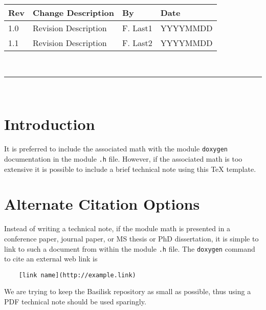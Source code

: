 \documentclass[]{BasiliskReportMemo}
\begin{document}
\makeCover

%
%
\pagestyle{empty}
{\renewcommand{\arraystretch}{2}
\noindent
\begin{longtable}{|p{0.5in}|p{3.5in}|p{1.07in}|p{0.9in}|}
\hline
{\bfseries Rev} & {\bfseries Change Description} & {\bfseries By}& {\bfseries Date} \\
\hline
1.0 & Revision Description & F. Last1 & YYYYMMDD\\
\hline
1.1 & Revision Description& F. Last2 & YYYYMMDD\\
\hline

\end{longtable}
}



\newpage
\setcounter{page}{1}
\pagestyle{fancy}

\tableofcontents %
~\\ \hrule ~\\ %



\section{Introduction}
It is preferred to include the associated math with the module {\tt doxygen} documentation in the module {\tt .h} file.  However, if the associated math is too extensive it is possible to include a brief technical note using this TeX template.



\section{Alternate Citation Options}
Instead of writing a technical note, if the module math is presented in a conference paper, journal paper, or MS thesis or PhD dissertation, it is simple to link to such a document from within the module {\tt .h} file.  The {\tt doxygen} command to cite an external web link is
\begin{verbatim}
	[link name](http://example.link)
\end{verbatim}
 We are trying to keep the Basilisk repository as small as possible, thus using a PDF technical note should be used sparingly.  








\end{document}
